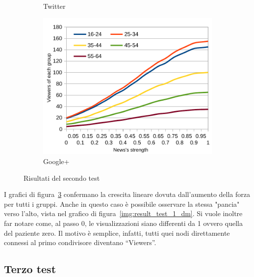 \begin{figure}[!ht]
\begin{subfigure}[c]{0.32\textwidth}
\begin{center}
    \end{center}
    \vspace*{-10pt}
    \caption{Twitter}
    \label{img:result_test_2_tw_2}
  \end{subfigure}  
  \begin{subfigure}[r]{0.32\textwidth}
    \begin{center}
      \includegraphics[width=1\textwidth]{charts/second-test-gp_2.pdf}
    \end{center}
    \vspace*{-10pt}
    \caption{Google+}
    \label{img:result_test_2_gp_2}
  \end{subfigure}  
 \caption{Risultati del secondo test}
 \label{img:results_test_2_2}
\end{figure}
\vspace*{-15pt}

I grafici di figura~\ref{img:results_test_2_2} confermano la crescita lineare dovuta dall'aumento della forza per tutti i gruppi.
Anche in questo caso è possibile osservare la stessa "pancia" verso l'alto, vista nel grafico di figura~\ref{img:result_test_1_dm}. 
Si vuole inoltre far notare come, al passo 0, le visualizzazioni siano differenti da 1 ovvero quella del paziente zero.
Il motivo è semplice, infatti, tutti quei nodi direttamente connessi al primo condivisore diventano ``Viewers''.

\subsection{Terzo test}
\label{section:third_test}

